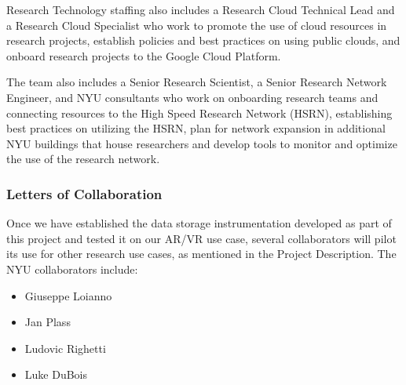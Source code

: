 Research Technology staffing also includes a Research Cloud Technical Lead and a Research Cloud Specialist who work to promote the use of cloud resources in research projects, establish policies and best practices on using public clouds, and onboard research projects to the Google Cloud Platform.

The team also includes a Senior Research Scientist, a Senior Research Network Engineer, and NYU consultants who work on onboarding research teams and connecting resources to the High Speed Research Network (HSRN), establishing best practices on utilizing the HSRN, plan for network expansion in additional NYU buildings that house researchers and develop tools to monitor and optimize the use of the research network.



\subsubsection*{Letters of Collaboration}

Once we have established the data storage instrumentation developed as part of this project and tested it on our AR/VR use case, several collaborators will pilot its use for other research use cases, as mentioned in the Project Description. The NYU collaborators include:

\begin{itemize}
    \item Giuseppe Loianno
    \item Jan Plass
    \item Ludovic Righetti
    \item Luke DuBois
\end{itemize}

